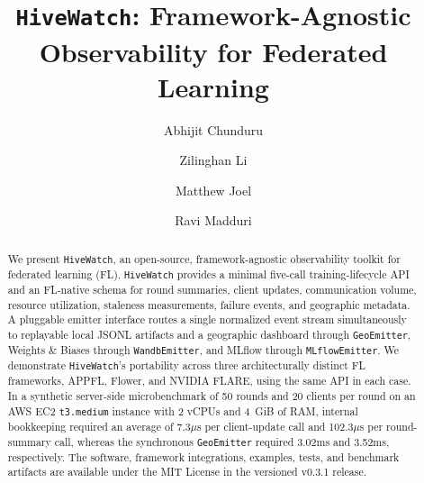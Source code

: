 \documentclass[preprint,12pt, a4paper]{elsarticle}
\newcommand{\rev}[1]{{\color{blue}#1}}
\newcommand{\rev}[1]{#1}
\begin{document}
\begin{frontmatter}



\title{\texttt{HiveWatch}: Framework-Agnostic Observability for Federated Learning}


\author[anl,umass]{Abhijit Chunduru}

\author[anl]{Zilinghan Li}

\author[anl]{Matthew Joel}

\author[anl,uchicago]{Ravi Madduri}


\address[anl]{Argonne National Laboratory, Lemont, IL, USA}
\address[umass]{University of Massachusetts Amherst, Amherst, MA, USA}
\address[uchicago]{The University of Chicago, Chicago, IL, USA}

\begin{abstract}
We present \texttt{HiveWatch}, an open-source, framework-agnostic observability toolkit for federated learning (FL). \texttt{HiveWatch} provides a minimal five-call training-lifecycle API and an FL-native schema for round summaries, client updates, communication volume, resource utilization, staleness measurements, failure events, and geographic metadata. A pluggable emitter interface routes a single normalized event stream simultaneously to replayable local JSONL artifacts and a geographic dashboard through \texttt{GeoEmitter}, Weights \& Biases through \texttt{WandbEmitter}, and MLflow through \texttt{MLflowEmitter}. We demonstrate \texttt{HiveWatch}'s portability across three architecturally distinct FL frameworks, APPFL, Flower, and NVIDIA FLARE, using the same API in each case. In a synthetic server-side microbenchmark of 50 rounds and 20 clients per round on an AWS EC2 \texttt{t3.medium} instance with 2 vCPUs and 4~GiB of RAM, internal bookkeeping required an average of 7.3$\mu$s per client-update call and 102.3$\mu$s per round-summary call, whereas the synchronous \texttt{GeoEmitter} required 3.02ms and 3.52ms, respectively. The software, framework integrations, examples, tests, and benchmark artifacts are available under the MIT License in the versioned \rev{v0.3.1} release.
\end{abstract}


\end{frontmatter}
\end{document}
